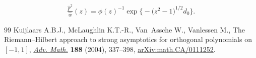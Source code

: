 \documentclass[10pt,a4paper]{amsart}
\newcommand{\hw}{\widehat w}
\newcommand{\hF}{\widehat F}
\numberwithin{equation}{section}
\begin{document}
\begin{align}\label{hat F^2/w at -1}
 \frac{\hF^2}{\hw}(z) = \phi(z)^{-1}\exp\bigl\lbrace-\big(z^2-1\big)^{1/2}d_0\bigr\rbrace.
\end{align}

\begin{thebibliography}{99}
Kuijlaars A.B.J., McLaughlin K.T.-R., Van~Assche W., Vanlessen M., The
 {R}iemann--{H}ilbert approach to strong asymptotics for orthogonal
 polynomials on {$[-1,1]$}, \href{https://doi.org/10.1016/j.aim.2003.08.015}{\textit{Adv. Math.}} \textbf{188} (2004), 337--398,
 \href{https://arxiv.org/abs/math.CA/0111252}{arXiv:math.CA/0111252}.
\end{thebibliography}
\end{document}
